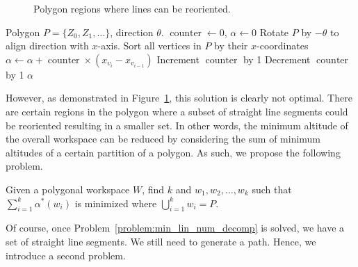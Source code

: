 \documentclass[../main.tex]{subfiles}
\begin{document}
\begin{figure}
	\centering
	\begin{subfigure}{0.5\linewidth}
		\centering
		
	\end{subfigure}%
	\begin{subfigure}{0.5\linewidth}
		\centering
		
	\end{subfigure}
	\caption{Polygon regions where lines can be reoriented.}
	\label{fig:reorder_regions}
\end{figure}

\begin{algorithm}
	\caption{$\operatorname{get\_general\_altitude}(P, \theta)$}
	\label{alg:altitude}
	\begin{algorithmic}[1]
		\REQUIRE Polygon $P=\{Z_0, Z_1,\ldots\}$, direction $\theta$.
			\STATE $\operatorname{counter}\gets 0$, $\alpha\gets 0$
			\STATE Rotate $P$ by $-\theta$ to align direction with $x$-axis.
			\STATE Sort all vertices in $P$ by their  $x$-coordinates
				\STATE $\alpha\gets \alpha+\operatorname{counter}\times(x_{v_{i}}-x_{v_{i-1}})$ 
					\STATE Increment $\operatorname{counter}$ by 1
					\STATE Decrement $\operatorname{counter}$ by 1
				\ENDIF
			\ENDFOR
			\RETURN $\alpha$
	\end{algorithmic}
\end{algorithm}

However, as demonstrated in Figure~\ref{fig:reorder_regions}, this solution is clearly not optimal. There are certain regions in the polygon where a subset of straight line segments could be reoriented resulting in a smaller set. In other words, the minimum altitude of the overall workspace can be reduced by considering the sum of minimum altitudes of a certain partition of a polygon. As such, we propose the following problem.

\begin{problem}
\label{problem:min_alt_decomp}
Given a polygonal workspace $W$, find $k$ and $w_1,w_2,\ldots,w_k$ such that $\sum^k_{i=1}\alpha^*(w_i)$ is minimized where $\bigcup^k_{i=1}w_i=P$.
\end{problem}

Of course, once Problem~\ref{problem:min_lin_num_decomp} is solved, we have a set of straight line segments. We still need to generate a path. Hence, we introduce a second problem.
\end{document}
